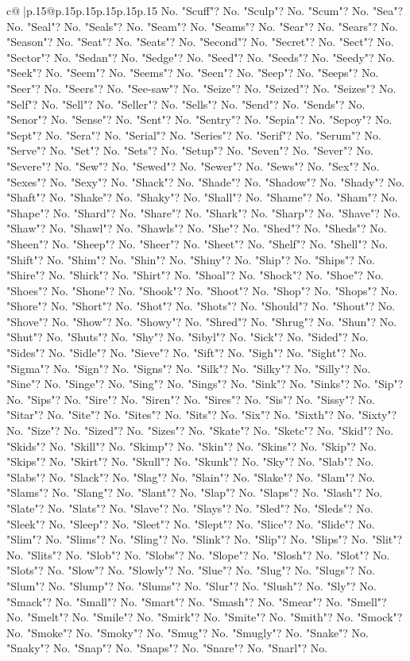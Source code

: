 \documentclass{article}
\begin{document}
{\begin{supertabular}{c@{$\;$}|p{.15\linewidth}@{}p{.15\linewidth}p{.15\linewidth}p{.15\linewidth}p{.15\linewidth}p{.15\linewidth}}
{{{No. "Scuff"? No. "Sculp"? No. "Scum"? No. "Sea"? No. "Seal"? No. "Seals"? No. "Seam"? No. "Seams"? No. "Sear"? No. "Sears"? No. "Season"? No. "Seat"? No. "Seats"? No. "Second"? No. "Secret"? No. "Sect"? No. "Sector"? No. "Sedan"? No. "Sedge"? No. "Seed"? No. "Seeds"? No. "Seedy"? No. "Seek"? No. "Seem"? No. "Seems"? No. "Seen"? No. "Seep"? No. "Seeps"? No. "Seer"? No. "Seers"? No. "See{-}saw"? No. "Seize"? No. "Seized"? No. "Seizes"? No. "Self"? No. "Sell"? No. "Seller"? No. "Sells"? No. "Send"? No. "Sends"? No. "Senor"? No. "Sense"? No. "Sent"? No. "Sentry"? No. "Sepia"? No. "Sepoy"? No. "Sept"? No. "Sera"? No. "Serial"? No. "Series"? No. "Serif"? No. "Serum"? No. "Serve"? No. "Set"? No. "Sets"? No. "Setup"? No. "Seven"? No. "Sever"? No. "Severe"? No. "Sew"? No. "Sewed"? No. "Sewer"? No. "Sews"? No. "Sex"? No. "Sexes"? No. "Sexy"? No. "Shack"? No. "Shade"? No. "Shadow"? No. "Shady"? No. "Shaft"? No. "Shake"? No. "Shaky"? No. "Shall"? No. "Shame"? No. "Sham"? No. "Shape"? No. "Shard"? No. "Share"? No. "Shark"? No. "Sharp"? No. "Shave"? No. "Shaw"? No. "Shawl"? No. "Shawls"? No. "She"? No. "Shed"? No. "Sheds"? No. "Sheen"? No. "Sheep"? No. "Sheer"? No. "Sheet"? No. "Shelf"? No. "Shell"? No. "Shift"? No. "Shim"? No. "Shin"? No. "Shiny"? No. "Ship"? No. "Ships"? No. "Shire"? No. "Shirk"? No. "Shirt"? No. "Shoal"? No. "Shock"? No. "Shoe"? No. "Shoes"? No. "Shone"? No. "Shook"? No. "Shoot"? No. "Shop"? No. "Shops"? No. "Shore"? No. "Short"? No. "Shot"? No. "Shots"? No. "Should"? No. "Shout"? No. "Shove"? No. "Show"? No. "Showy"? No. "Shred"? No. "Shrug"? No. "Shun"? No. "Shut"? No. "Shuts"? No. "Shy"? No. "Sibyl"? No. "Sick"? No. "Sided"? No. "Sides"? No. "Sidle"? No. "Sieve"? No. "Sift"? No. "Sigh"? No. "Sight"? No. "Sigma"? No. "Sign"? No. "Signs"? No. "Silk"? No. "Silky"? No. "Silly"? No. "Sine"? No. "Singe"? No. "Sing"? No. "Sings"? No. "Sink"? No. "Sinks"? No. "Sip"? No. "Sips"? No. "Sire"? No. "Siren"? No. "Sires"? No. "Sis"? No. "Sissy"? No. "Sitar"? No. "Site"? No. "Sites"? No. "Sits"? No. "Six"? No. "Sixth"? No. "Sixty"? No. "Size"? No. "Sized"? No. "Sizes"? No. "Skate"? No. "Sketc"? No. "Skid"? No. "Skids"? No. "Skill"? No. "Skimp"? No. "Skin"? No. "Skins"? No. "Skip"? No. "Skips"? No. "Skirt"? No. "Skull"? No. "Skunk"? No. "Sky"? No. "Slab"? No. "Slabs"? No. "Slack"? No. "Slag"? No. "Slain"? No. "Slake"? No. "Slam"? No. "Slams"? No. "Slang"? No. "Slant"? No. "Slap"? No. "Slaps"? No. "Slash"? No. "Slate"? No. "Slats"? No. "Slave"? No. "Slays"? No. "Sled"? No. "Sleds"? No. "Sleek"? No. "Sleep"? No. "Sleet"? No. "Slept"? No. "Slice"? No. "Slide"? No. "Slim"? No. "Slims"? No. "Sling"? No. "Slink"? No. "Slip"? No. "Slips"? No. "Slit"? No. "Slits"? No. "Slob"? No. "Slobs"? No. "Slope"? No. "Slosh"? No. "Slot"? No. "Slots"? No. "Slow"? No. "Slowly"? No. "Slue"? No. "Slug"? No. "Slugs"? No. "Slum"? No. "Slump"? No. "Slums"? No. "Slur"? No. "Slush"? No. "Sly"? No. "Smack"? No. "Small"? No. "Smart"? No. "Smash"? No. "Smear"? No. "Smell"? No. "Smelt"? No. "Smile"? No. "Smirk"? No. "Smite"? No. "Smith"? No. "Smock"? No. "Smoke"? No. "Smoky"? No. "Smug"? No. "Smugly"? No. "Snake"? No. "Snaky"? No. "Snap"? No. "Snaps"? No. "Snare"? No. "Snarl"? No. }}}
\end{supertabular}}
\end{document}
